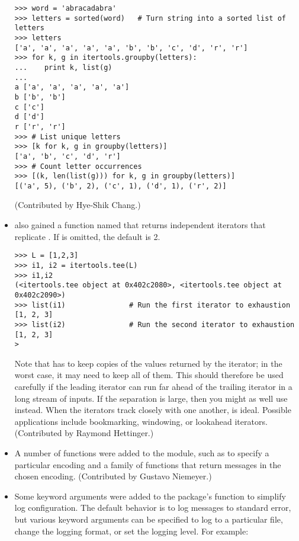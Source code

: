 \documentclass{howto}
\begin{document}
\begin{itemize}
\begin{verbatim}
>>> word = 'abracadabra'
>>> letters = sorted(word)   # Turn string into a sorted list of letters
>>> letters 
['a', 'a', 'a', 'a', 'a', 'b', 'b', 'c', 'd', 'r', 'r']
>>> for k, g in itertools.groupby(letters):
...    print k, list(g)
... 
a ['a', 'a', 'a', 'a', 'a']
b ['b', 'b']
c ['c']
d ['d']
r ['r', 'r']
>>> # List unique letters
>>> [k for k, g in groupby(letters)]                     
['a', 'b', 'c', 'd', 'r']
>>> # Count letter occurrences
>>> [(k, len(list(g))) for k, g in groupby(letters)]     
[('a', 5), ('b', 2), ('c', 1), ('d', 1), ('r', 2)]
\end{verbatim}

(Contributed by Hye-Shik Chang.)

\item {} also gained a function named
 that returns  independent
iterators that replicate .  If  is omitted, the
default is 2.

\begin{verbatim}
>>> L = [1,2,3]
>>> i1, i2 = itertools.tee(L)
>>> i1,i2
(<itertools.tee object at 0x402c2080>, <itertools.tee object at 0x402c2090>)
>>> list(i1)               # Run the first iterator to exhaustion
[1, 2, 3]
>>> list(i2)               # Run the second iterator to exhaustion
[1, 2, 3]
>\end{verbatim}

Note that  has to keep copies of the values returned 
by the iterator; in the worst case, it may need to keep all of them.  
This should therefore be used carefully if the leading iterator
can run far ahead of the trailing iterator in a long stream of inputs.
If the separation is large, then you might as well use 
 instead.  When the iterators track closely with one
another,  is ideal.  Possible applications include
bookmarking, windowing, or lookahead iterators.
(Contributed by Raymond Hettinger.)       

\item  A number of functions were added to the  
module, such as  to specify a
particular encoding and a family of  functions
that return messages in the chosen encoding.
(Contributed by Gustavo Niemeyer.)

\item Some keyword arguments were added to the 
package's  function to simplify log
configuration.  The default behavior is to log messages to standard
error, but various keyword arguments can be specified to log to a
particular file, change the logging format, or set the logging level.
For example:


\end{itemize}
\end{document}
